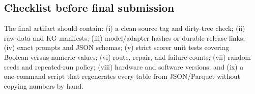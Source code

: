 \subsection{Checklist before final submission}

The final artifact should contain: (i) a clean source tag and dirty-tree check; (ii) raw-data and
KG manifests; (iii) model/adapter hashes or durable release links; (iv) exact prompts and JSON
schemas; (v) strict scorer unit tests covering Boolean versus numeric values; (vi) route,
repair, and failure counts; (vii) random seeds and repeated-run policy; (viii) hardware and
software versions; and (ix) a one-command script that regenerates every table from JSON/Parquet
without copying numbers by hand.
